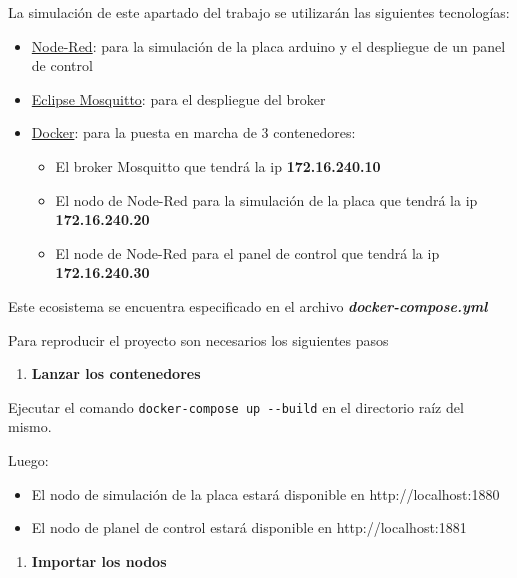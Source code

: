 \documentclass[11pt]{article}
\providecommand{\tightlist}{%
      \setlength{\itemsep}{0pt}\setlength{\parskip}{0pt}}
\begin{document}
La simulación de este apartado del trabajo se utilizarán las siguientes
tecnologías:

\begin{itemize}
\item
  \href{https://nodered.org/}{Node-Red}: para la simulación de la placa
  arduino y el despliegue de un panel de control
\item
  \href{https://mosquitto.org/}{Eclipse Mosquitto}: para el despliegue
  del broker
\item
  \href{https://www.docker.com/}{Docker}: para la puesta en marcha de 3
  contenedores:

  \begin{itemize}
  \item
    El broker Mosquitto que tendrá la ip \textbf{172.16.240.10}
  \item
    El nodo de Node-Red para la simulación de la placa que tendrá la ip
    \textbf{172.16.240.20}
  \item
    El node de Node-Red para el panel de control que tendrá la ip
    \textbf{172.16.240.30}
  \end{itemize}
\end{itemize}

Este ecosistema se encuentra especificado en el archivo
\textbf{\emph{docker-compose.yml}}

Para reproducir el proyecto son necesarios los siguientes pasos

\begin{enumerate}
\def\labelenumi{\arabic{enumi})}
\tightlist
\item
  \textbf{Lanzar los contenedores}
\end{enumerate}

Ejecutar el comando \texttt{docker-compose\ up\ -\/-build} en el
directorio raíz del mismo.

Luego:

\begin{itemize}
\item
  El nodo de simulación de la placa estará disponible en
  http://localhost:1880
\item
  El nodo de planel de control estará disponible en
  http://localhost:1881
\end{itemize}

\begin{enumerate}
\def\labelenumi{\arabic{enumi})}
\setcounter{enumi}{1}
\tightlist
\item
  \textbf{Importar los nodos}
\end{enumerate}
\end{document}
